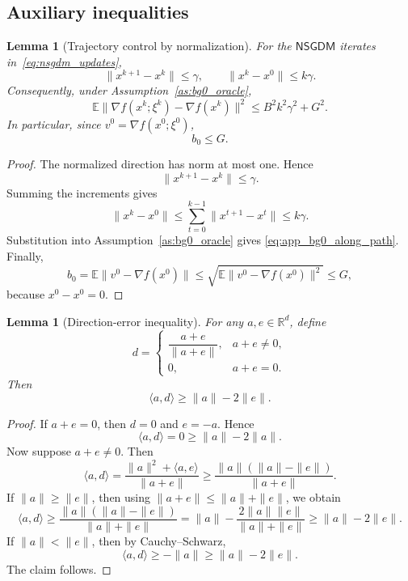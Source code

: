 \documentclass[letter,11pt]{article}
\newtheorem{lemma}[]{Lemma}
\newcommand{\E}{\mathbb{E}}
\newcommand{\R}{\mathbb{R}}
\begin{document}
\subsection{Auxiliary inequalities}
\label{app:nsgdm_aux}

\begin{lemma}[Trajectory control by normalization]
\label{lem:app_traj_control}
For the \(\mathsf{NSGDM}\) iterates in~\eqref{eq:nsgdm_updates},
\[
    \|x^{k+1}-x^k\|\le \gamma,
    \qquad
    \|x^k-x^0\|\le k\gamma.
\]
Consequently, under Assumption~\ref{as:bg0_oracle},
\begin{equation}
\label{eq:app_bg0_along_path}
    \E\|\nabla f(x^k;\xi^k)-\nabla f(x^k)\|^2
    \le B^2k^2\gamma^2+G^2.
\end{equation}
In particular, since \(v^0=\nabla f(x^0;\xi^0)\),
\begin{equation}
\label{eq:app_B0_bound}
    b_0\le G.
\end{equation}
\end{lemma}

\begin{proof}
The normalized direction has norm at most one. Hence
\[
    \|x^{k+1}-x^k\|\le \gamma.
\]
Summing the increments gives
\[
    \|x^k-x^0\|
    \le
    \sum_{t=0}^{k-1}\|x^{t+1}-x^t\|
    \le
    k\gamma.
\]
Substitution into Assumption~\ref{as:bg0_oracle} gives
\eqref{eq:app_bg0_along_path}. Finally,
\[
    b_0
    =
    \E\|v^0-\nabla f(x^0)\|
    \le
    \sqrt{\E\|v^0-\nabla f(x^0)\|^2}
    \le
    G,
\]
because \(x^0-x^0=0\).
\end{proof}

\begin{lemma}[Direction-error inequality]
\label{lem:app_direction_error}
For any \(a,e\in\R^d\), define
\[
    d=
    \begin{cases}
        \dfrac{a+e}{\|a+e\|}, & a+e\neq0,\\[4pt]
        0, & a+e=0.
    \end{cases}
\]
Then
\begin{equation}
\label{eq:app_direction_error}
    \langle a,d\rangle\ge \|a\|-2\|e\|.
\end{equation}
\end{lemma}

\begin{proof}
If \(a+e=0\), then \(d=0\) and \(e=-a\). Hence
\[
    \langle a,d\rangle=0\ge \|a\|-2\|a\|.
\]
Now suppose \(a+e\neq0\). Then
\[
    \langle a,d\rangle
    =
    \frac{\|a\|^2+\langle a,e\rangle}{\|a+e\|}
    \ge
    \frac{\|a\|(\|a\|-\|e\|)}{\|a+e\|}.
\]
If \(\|a\|\ge\|e\|\), then using
\(\|a+e\|\le \|a\|+\|e\|\), we obtain
\[
    \langle a,d\rangle
    \ge
    \frac{\|a\|(\|a\|-\|e\|)}{\|a\|+\|e\|}
    =
    \|a\|-\frac{2\|a\|\|e\|}{\|a\|+\|e\|}
    \ge
    \|a\|-2\|e\|.
\]
If \(\|a\|<\|e\|\), then by Cauchy--Schwarz,
\[
    \langle a,d\rangle\ge -\|a\|\ge \|a\|-2\|e\|.
\]
The claim follows.
\end{proof}
\end{document}

